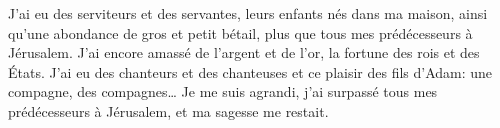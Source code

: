 J’ai eu des serviteurs et des servantes, leurs enfants nés dans ma maison,
	ainsi qu’une abondance de gros et petit bétail,
	plus que tous mes prédécesseurs à Jérusalem.
J’ai encore amassé de l’argent et de l’or, la fortune des rois et des États.
J’ai eu des chanteurs et des chanteuses et ce plaisir des fils d’Adam:
	une compagne, des compagnes…
Je me suis agrandi, j’ai surpassé tous mes prédécesseurs à Jérusalem,
	et ma sagesse me restait.
